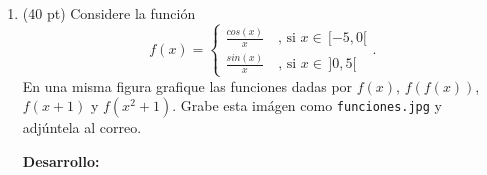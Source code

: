 \documentclass[11pt]{article}
\begin{document}
\begin{enumerate}



\item (40 pt) Considere la funci\'on
$$
f(x)=
\begin{cases}
\frac{cos(x)}{x} \quad  \text{, si } x\in\,[-5,0[\\
\frac{sin(x)}{x} \quad  \text{, si } x\in\,]0,5[
\end{cases}.
$$
En una misma figura grafique las funciones dadas por $f(x)$, $f(f(x))$, $f(x+1)$ y $f(x^2+1)$. Grabe esta im\'agen como \texttt{funciones.jpg} y adj\'untela al correo.

\textbf{Desarrollo:}



\end{enumerate}
\end{document}
